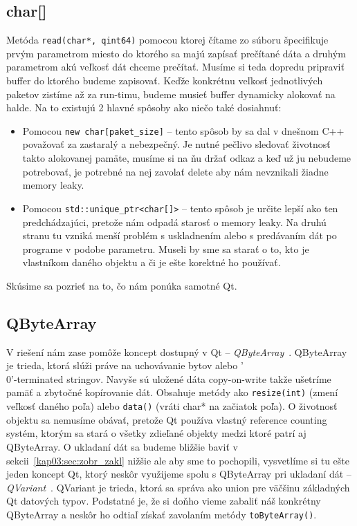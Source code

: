 \subsection*{char[]}
Metóda \texttt{read(char*, qint64)} pomocou ktorej čítame zo súboru špecifikuje prvým parametrom miesto do ktorého sa majú zapísať prečítané dáta a druhým parametrom akú veľkosť dát chceme prečítať. Musíme si teda dopredu pripraviť buffer do ktorého budeme zapisovať. Keďže konkrétnu veľkosť jednotlivých paketov zistíme až za run-timu, budeme musieť buffer dynamicky alokovať na halde. Na to existujú 2 hlavné spôsoby ako niečo také dosiahnuť:
\begin{itemize}
\item Pomocou \texttt{new char[paket\_size]} -- tento spôsob by sa dal v dnešnom C++ považovať za zastaralý a nebezpečný. Je nutné pečlivo sledovať životnosť takto alokovanej pamäte, musíme si na ňu držať odkaz a keď už ju nebudeme potrebovať, je potrebné na nej zavolať delete aby nám nevznikali žiadne memory leaky.
\item Pomocou \texttt{std::unique\_ptr\textless char[]\textgreater} -- tento spôsob je určite lepší ako ten predchádzajúci, pretože nám odpadá starosť o memory leaky. Na druhú stranu tu vzniká menší problém s uskladnením alebo s predávaním dát po programe v podobe parametru. Museli by sme sa starať o to, kto je vlastníkom daného objektu a či je ešte korektné ho používať.
\end{itemize}

Skúsime sa pozrieť na to, čo nám ponúka samotné Qt.

\subsection*{QByteArray}
\label{kap03:sec:uch_dat:qbytearray}
V riešení nám zase pomôže koncept dostupný v Qt -- \textit{QByteArray}~\cite{qbytearray}. QByteArray je trieda, ktorá slúži práve na uchovávanie bytov alebo '\\0'-terminated stringov. Navyše sú uložené dáta copy-on-write takže ušetríme pamäť a zbytočné kopírovanie dát. Obsahuje metódy ako \texttt{resize(int)} (zmení veľkosť daného poľa) alebo \texttt{data()} (vráti char* na začiatok poľa). O životnosť objektu sa nemusíme obávať, pretože Qt používa vlastný reference counting systém, ktorým sa stará o všetky zdieľané objekty medzi ktoré patrí aj QByteArray. O ukladaní dát sa budeme bližšie baviť v sekcii~\ref{kap03:sec:zobr_zakl} nižšie ale aby sme to pochopili, vysvetlíme si tu ešte jeden koncept Qt, ktorý neskôr využijeme spolu s QByteArray pri ukladaní dát -- \textit{QVariant}~\cite{qvariant}. QVariant je trieda, ktorá sa správa ako union pre väčšinu základných Qt datových typov. Podstatné je, že si doňho vieme zabaliť náš konkrétny QByteArray a neskôr ho odtiaľ získať zavolaním metódy \texttt{toByteArray()}.



